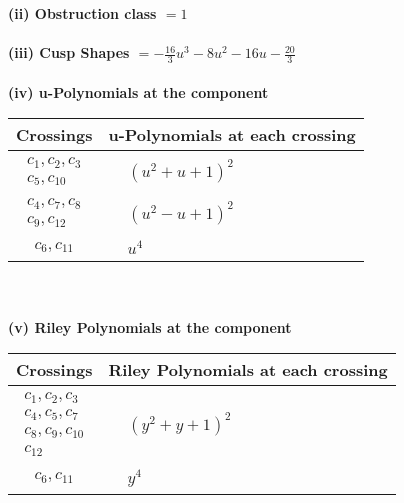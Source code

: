 \documentclass[1p]{elsarticle_modified}
\theoremstyle{definition}
\begin{document}
\flushleft \textbf{(ii) Obstruction class $= 1$}\\~\\
\flushleft \textbf{(iii) Cusp Shapes $= -\frac{16}{3} u^3-8 u^2-16 u-\frac{20}{3}$}\\~\\
\newpage\renewcommand{\arraystretch}{1}
\flushleft \textbf{(iv) u-Polynomials at the component}\newline \\
\begin{tabular}{m{50pt}|m{274pt}}
Crossings & \hspace{64pt}u-Polynomials at each crossing \\
\hline $$\begin{aligned}c_{1},c_{2},c_{3}\\c_{5},c_{10}\end{aligned}$$&$\begin{aligned}
&(u^2+u+1)^2
\end{aligned}$\\
\hline $$\begin{aligned}c_{4},c_{7},c_{8}\\c_{9},c_{12}\end{aligned}$$&$\begin{aligned}
&(u^2- u+1)^2
\end{aligned}$\\
\hline $$\begin{aligned}c_{6},c_{11}\end{aligned}$$&$\begin{aligned}
&u^4
\end{aligned}$\\
\hline
\end{tabular}\\~\\
\newpage\renewcommand{\arraystretch}{1}
\flushleft \textbf{(v) Riley Polynomials at the component}\newline \\
\begin{tabular}{m{50pt}|m{274pt}}
Crossings & \hspace{64pt}Riley Polynomials at each crossing \\
\hline $$\begin{aligned}c_{1},c_{2},c_{3}\\c_{4},c_{5},c_{7}\\c_{8},c_{9},c_{10}\\c_{12}\end{aligned}$$&$\begin{aligned}
&(y^2+y+1)^2
\end{aligned}$\\
\hline $$\begin{aligned}c_{6},c_{11}\end{aligned}$$&$\begin{aligned}
&y^4
\end{aligned}$\\
\hline
\end{tabular}\\~\\
\end{document}

